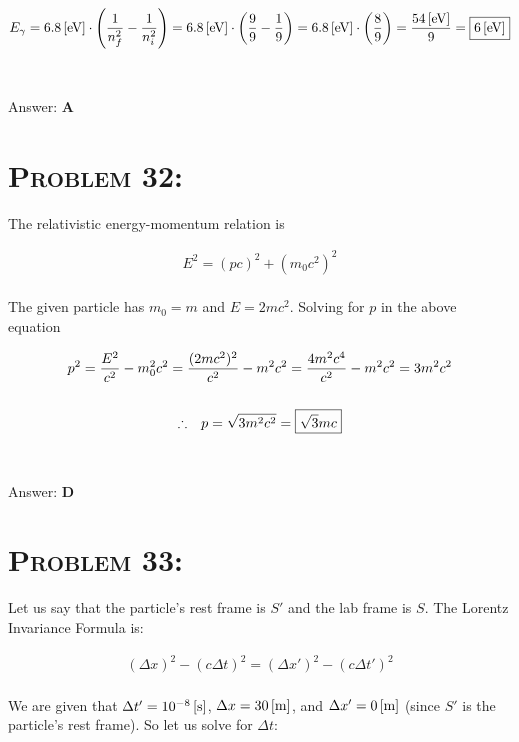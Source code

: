 \documentclass{article}
\begin{document}
\begin{gather}
E_{\gamma} = \unit[6.8]{[eV]} \cdot \left(  \frac{1}{n^{2}_{f}} - \frac{1}{n^{2}_{i}} \right) = \unit[6.8]{[eV]}  \cdot \left(  \frac{9}{9} - \frac{1}{9} \right) = \unit[6.8]{[eV]}  \cdot \left(  \frac{8}{9}   \right) = \frac{\unit[54]{[eV]} }{9} = \boxed{\unit[6]{[eV]}} \nonumber
\end{gather}
\\\\
Answer: \textbf{\textcolor{ProcessBlue}A}\\


\section{\textsc{Problem 32:}} The relativistic energy-momentum relation is

\begin{gather}
\label{eq:rel-energy} E^{2} = (pc)^{2} + (m_{0} c^{2})^{2}
\end{gather}
\\
The given particle has $m_{0} = m$ and $E = 2mc^{2}$. Solving for $p$ in the above equation

\begin{gather}
p^{2} = \frac{E^{2}}{c^{2}} -  m_{0}^{2}c^{2}  =  \frac{(2mc^{2})^{2}}{c^{2}} -  m^{2}c^{2}  = \frac{4m^{2}c^{4}}{c^{2}} -  m^{2}c^{2} = 3m^{2}c^{2}\nonumber\\
\nonumber\\
\therefore \hspace{.1in} p = \sqrt{3m^{2}c^{2}} = \boxed{\sqrt{3} m c}\nonumber
\end{gather}
\\\\
Answer: \textbf{\textcolor{ProcessBlue}D}\\


\section{\textsc{Problem 33:}} Let us say that the particle's rest frame is $S'$ and the lab frame is $S$. The Lorentz Invariance Formula is:

\begin{gather}
\left(  \Delta x  \right)^{2}  - \left(  c \Delta t  \right)^{2}  = \left(  \Delta x'  \right)^{2}  - \left(  c \Delta t'  \right)^{2}
\end{gather}
\\
We are given that $\Delta t' = \unit[10^{-8}]{[s]}$, $\Delta x = \unit[30]{[m]}$, and $\Delta x' = \unit[0]{[m]}$ (since $S'$ is the particle's rest frame). So let us solve for $\Delta t$:
\end{document}
